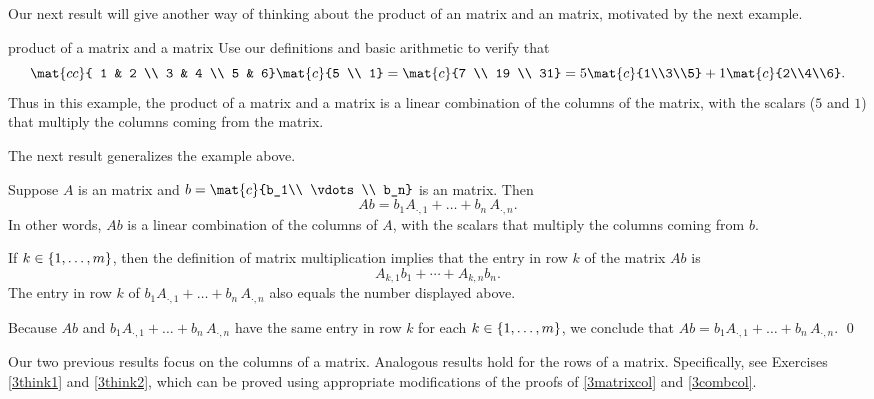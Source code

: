 Our next result will give another way of thinking about the product of an  matrix and an  matrix, motivated by the next example.

\begin{example}{product of a  matrix and a  matrix}
Use our definitions and basic arithmetic to verify that
\vspace{-.03in}
\[
\mat{cc}{
1 & 2 \\
3 & 4 \\
5 & 6} \mat{c}{5 \\ 1} = \mat{c}{7 \\ 19 \\ 31}
= 5 \mat{c}{1\\3\\5} + 1 \mat{c}{2\\4\\6}.
\vspace{-.03in}
\]
Thus in this example, the product of a  matrix and a  matrix is a linear combination of the columns of the  matrix, with the scalars ($5$ and $1$) that multiply the columns coming from the  matrix.
\end{example}

\pagebreak[2]

The next result generalizes the example above.

{Suppose $A$ is an  matrix and
$
b = \mat{c}{b_1\\ \vdots \\ b_n}
$
is an  matrix. Then
\[
Ab = b_1 A_{\cdot, 1} + \dots + b_n \, A_{\cdot, n}.
\]
In other words, $Ab$ is a linear combination of the columns of $A$, with the scalars that multiply the columns coming from $b$.}

\proof
If $k \in \{1, \ldots, m\}$, then the definition of matrix multiplication implies that the entry in row $k$ of the  matrix $Ab$ is
\[
A_{k, 1} b_1 + \cdots + A_{k,n} b_n.
\]
The entry in row $k$ of $b_1 A_{\cdot, 1} + \dots + b_n \, A_{\cdot, n}$ also equals the number displayed above.

Because $Ab$ and $b_1 A_{\cdot, 1} + \dots + b_n \, A_{\cdot, n}$ have the same entry in row $k$ for each $k \in \{1, \ldots, m\}$, we conclude that $Ab = b_1 A_{\cdot, 1} + \dots + b_n \, A_{\cdot, n}$.
\qed

Our two previous results focus on the columns of a matrix. Analogous results hold for the rows of a matrix. Specifically, see Exercises \ref{3think1} and \ref{3think2}, which can be proved using appropriate modifications of the proofs of \ref{3matrixcol} and \ref{3combcol}.

